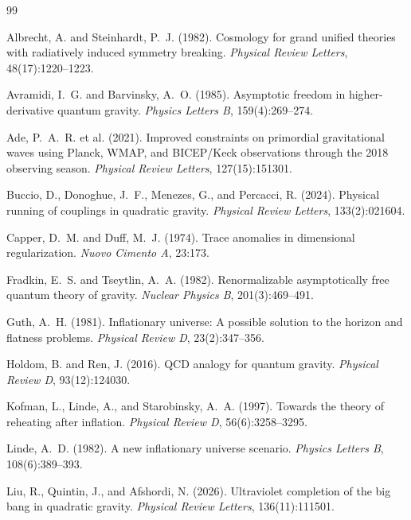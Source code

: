 \documentclass[12pt, a4paper]{article}
\begin{document}

\begin{thebibliography}{99}

Albrecht, A. and Steinhardt, P.~J. (1982).
Cosmology for grand unified theories with radiatively induced symmetry breaking.
\textit{Physical Review Letters}, 48(17):1220--1223.

Avramidi, I.~G. and Barvinsky, A.~O. (1985).
Asymptotic freedom in higher-derivative quantum gravity.
\textit{Physics Letters B}, 159(4):269--274.

Ade, P.~A.~R. et al. (2021).
Improved constraints on primordial gravitational waves using Planck, WMAP, and BICEP/Keck observations through the 2018 observing season.
\textit{Physical Review Letters}, 127(15):151301.

Buccio, D., Donoghue, J.~F., Menezes, G., and Percacci, R. (2024).
Physical running of couplings in quadratic gravity.
\textit{Physical Review Letters}, 133(2):021604.

Capper, D.~M. and Duff, M.~J. (1974).
Trace anomalies in dimensional regularization.
\textit{Nuovo Cimento A}, 23:173.

Fradkin, E.~S. and Tseytlin, A.~A. (1982).
Renormalizable asymptotically free quantum theory of gravity.
\textit{Nuclear Physics B}, 201(3):469--491.

Guth, A.~H. (1981).
Inflationary universe: A possible solution to the horizon and flatness problems.
\textit{Physical Review D}, 23(2):347--356.

Holdom, B. and Ren, J. (2016).
QCD analogy for quantum gravity.
\textit{Physical Review D}, 93(12):124030.

Kofman, L., Linde, A., and Starobinsky, A.~A. (1997).
Towards the theory of reheating after inflation.
\textit{Physical Review D}, 56(6):3258--3295.

Linde, A.~D. (1982).
A new inflationary universe scenario.
\textit{Physics Letters B}, 108(6):389--393.

Liu, R., Quintin, J., and Afshordi, N. (2026).
Ultraviolet completion of the big bang in quadratic gravity.
\textit{Physical Review Letters}, 136(11):111501.


\end{thebibliography}
\end{document}
